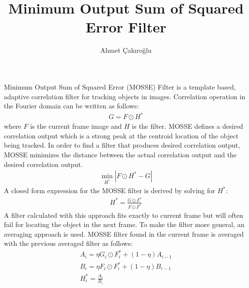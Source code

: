\documentclass{article}
\title{Minimum Output Sum of Squared Error Filter}
\author{Ahmet Çakıroğlu}
\date{}
\begin{document}
\maketitle
Minimum Output Sum of Squared Error (MOSSE) Filter is a template based, adaptive correlation filter for tracking objects in images. Correlation operation in the Fourier domain can be written as follows:
\begin{gather}
G=F\odot H^*
\end{gather}
where $F$ is the current frame image and $H$ is the filter. MOSSE defines a desired correlation output which is a strong peak at the centroid location of the object being tracked. In order to find a filter that produces desired correlation output, MOSSE minimizes the distance between the actual correlation output and the desired correlation output.
\begin{gather}
\min_{H^*}|F\odot H^* - G|
\end{gather}
A closed form expression for the MOSSE filter is derived by solving for $H^*$:
\begin{gather}
H^* = \frac{G \odot F^*}{F \odot F^*}
\end{gather}
A filter calculated with this approach fits exactly to current frame but will often fail for locating the object in the next frame. To make the filter more general, an averaging approach is used. MOSSE filter found in the current frame is averaged with the previous averaged filter as follows:
\begin{gather}
\nonumber
A_i = \eta G_i \odot F_i^* + (1-\eta) A_{i-1}\\ \nonumber
B_i = \eta F_i \odot F_i^* + (1-\eta) B_{i-1}\\
H_i^* = \frac{A_i}{B_i}
\end{gather}
\end{document}
